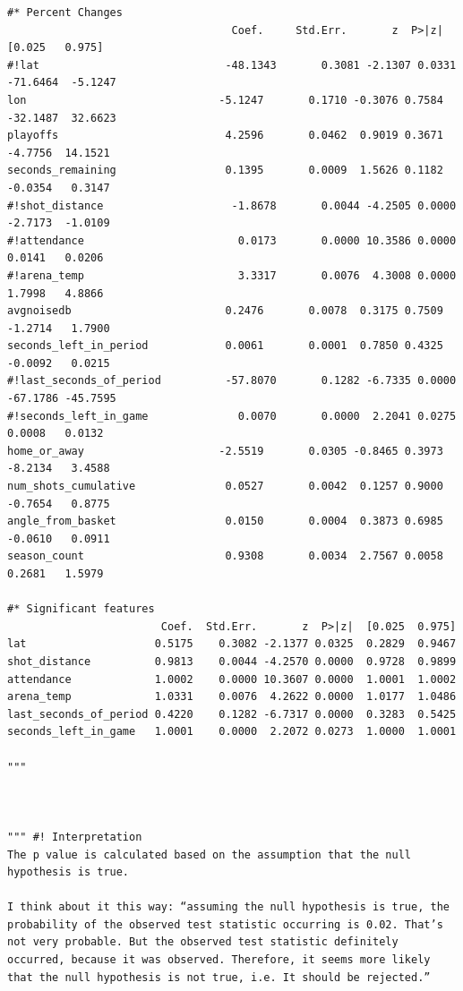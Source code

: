 \begin{verbatim}
#* Percent Changes
                                   Coef.     Std.Err.       z  P>|z|    [0.025   0.975]
#!lat                             -48.1343       0.3081 -2.1307 0.0331  -71.6464  -5.1247
lon                              -5.1247       0.1710 -0.3076 0.7584  -32.1487  32.6623
playoffs                          4.2596       0.0462  0.9019 0.3671   -4.7756  14.1521
seconds_remaining                 0.1395       0.0009  1.5626 0.1182   -0.0354   0.3147
#!shot_distance                    -1.8678       0.0044 -4.2505 0.0000   -2.7173  -1.0109
#!attendance                        0.0173       0.0000 10.3586 0.0000    0.0141   0.0206
#!arena_temp                        3.3317       0.0076  4.3008 0.0000    1.7998   4.8866
avgnoisedb                        0.2476       0.0078  0.3175 0.7509   -1.2714   1.7900
seconds_left_in_period            0.0061       0.0001  0.7850 0.4325   -0.0092   0.0215
#!last_seconds_of_period          -57.8070       0.1282 -6.7335 0.0000  -67.1786 -45.7595
#!seconds_left_in_game              0.0070       0.0000  2.2041 0.0275    0.0008   0.0132
home_or_away                     -2.5519       0.0305 -0.8465 0.3973   -8.2134   3.4588
num_shots_cumulative              0.0527       0.0042  0.1257 0.9000   -0.7654   0.8775
angle_from_basket                 0.0150       0.0004  0.3873 0.6985   -0.0610   0.0911
season_count                      0.9308       0.0034  2.7567 0.0058    0.2681   1.5979

#* Significant features
                        Coef.  Std.Err.       z  P>|z|  [0.025  0.975]
lat                    0.5175    0.3082 -2.1377 0.0325  0.2829  0.9467
shot_distance          0.9813    0.0044 -4.2570 0.0000  0.9728  0.9899
attendance             1.0002    0.0000 10.3607 0.0000  1.0001  1.0002
arena_temp             1.0331    0.0076  4.2622 0.0000  1.0177  1.0486
last_seconds_of_period 0.4220    0.1282 -6.7317 0.0000  0.3283  0.5425
seconds_left_in_game   1.0001    0.0000  2.2072 0.0273  1.0000  1.0001

"""



""" #! Interpretation
The p value is calculated based on the assumption that the null hypothesis is true.

I think about it this way: “assuming the null hypothesis is true, the probability of the observed test statistic occurring is 0.02. That’s not very probable. But the observed test statistic definitely occurred, because it was observed. Therefore, it seems more likely that the null hypothesis is not true, i.e. It should be rejected.”


\end{verbatim}
